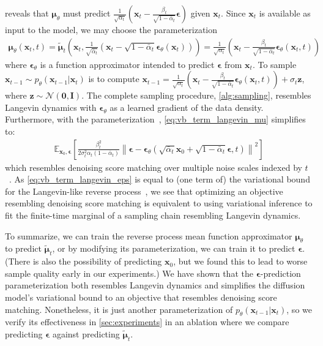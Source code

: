 \documentclass{article}
\newcommand{\E}{\mathbb{E}}
\newcommand{\Eb}[2]{\E_{#1}\!\left[#2\right]}
\newcommand{\bI}{\mathbf{I}}
\newcommand{\bzero}{\mathbf{0}}
\newcommand{\bx}{\mathbf{x}}
\newcommand{\bz}{\mathbf{z}}
\newcommand{\bepsilon}{{\boldsymbol{\epsilon}}}
\newcommand{\bmu}{{\boldsymbol{\mu}}}
\begin{document}
 reveals that $\bmu_\theta$ must predict $\frac{1}{\sqrt{\alpha_t}}\left( \bx_t  - \frac{\beta_t}{\sqrt{1-\bar\alpha_t}}\bepsilon \right)$ given $\bx_t$. Since $\bx_t$ is available as input to the model, we may choose the parameterization
\begin{align}
\bmu_\theta(\bx_t, t) = \tilde\bmu_t\!\left(\bx_t,  \frac{1}{\sqrt{\bar\alpha_t}} (\bx_t - \sqrt{1-\bar\alpha_t}\bepsilon_\theta(\bx_t)) \right) = \frac{1}{\sqrt{\alpha_t}}\left( \bx_t - \frac{\beta_t}{\sqrt{1-\bar\alpha_t}} \bepsilon_\theta(\bx_t, t) \right) \label{eq:mu_func_approx_langevin}
\end{align}
where $\bepsilon_\theta$ is a function approximator intended to predict $\bepsilon$ from $\bx_t$. To sample $\bx_{t-1} \sim p_\theta(\bx_{t-1}|\bx_t)$ is to compute
$
\bx_{t-1} = \frac{1}{\sqrt{\alpha_t}}\left( \bx_t - \frac{\beta_t}{\sqrt{1-\bar\alpha_t}} \bepsilon_\theta(\bx_t, t) \right) + \sigma_t \bz$, where $\bz \sim \mathcal{N}(\bzero, \bI)
$.
The complete sampling procedure, \cref{alg:sampling}, resembles Langevin dynamics with $\bepsilon_\theta$ as a learned gradient of the data density.
Furthermore, with the parameterization~, \cref{eq:vb_term_langevin_mu} simplifies to:
\begin{align}
    \Eb{\bx_0, \bepsilon}{ \frac{\beta_t^2}{2\sigma_t^2 \alpha_t (1-\bar\alpha_t)}  \left\| \bepsilon - \bepsilon_\theta(\sqrt{\bar\alpha_t} \bx_0 + \sqrt{1-\bar\alpha_t}\bepsilon, t) \right\|^2} \label{eq:vb_term_langevin_eps}
\end{align}
which resembles denoising score matching over multiple noise scales indexed by $t$~\citep{song2019generative}. As \cref{eq:vb_term_langevin_eps} is equal to (one term of) the variational bound for the Langevin-like reverse process~, we see that optimizing an objective resembling denoising score matching is equivalent to using variational inference to fit the finite-time marginal of a sampling chain resembling Langevin dynamics.

To summarize, we can train the reverse process mean function approximator $\bmu_\theta$ to predict $\tilde\bmu_t$, or by modifying its parameterization, we can train it to predict $\bepsilon$. (There is also the possibility of predicting $\bx_0$, but we found this to lead to worse sample quality early in our experiments.) We have shown that the  $\bepsilon$-prediction parameterization both resembles Langevin dynamics and simplifies the diffusion model's variational bound to an objective that resembles denoising score matching.
Nonetheless, it is just another parameterization of $p_\theta(\bx_{t-1}|\bx_t)$, so we verify its effectiveness in \cref{sec:experiments} in an ablation where we compare predicting $\bepsilon$ against predicting $\tilde\bmu_t$.
\end{document}
